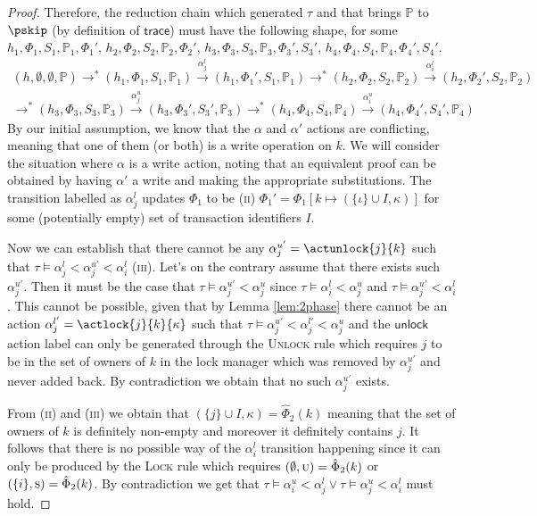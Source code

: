 \begin{proof}
Therefore, the reduction chain which generated $\tau$ and that brings $\mathds{P}$ to $\pskip$ (by definition of $\mathsf{trace}$) must have the following shape, for some $h_1, \Phi_1, S_1, \mathds{P}_1, \Phi_1'$, $h_2, \Phi_2, S_2, \mathds{P}_2, \Phi_2'$, $h_3, \Phi_3, S_3, \mathds{P}_3, \Phi_3', S_3'$, $h_4, \Phi_4, S_4, \mathds{P}_4, \Phi_4', S_4'$.
\begin{gather*}
(h, \emptyset, \emptyset, \mathds{P}) \rightarrow^* (h_1, \Phi_1, S_1, \mathds{P}_1) \xrightarrow{\alpha_j^l} (h_1, \Phi_1', S_1, \mathds{P}_1) \rightarrow^* (h_2, \Phi_2, S_2, \mathds{P}_2) \xrightarrow{\alpha_i^l} (h_2, \Phi_2', S_2, \mathds{P}_2)
\\
\rightarrow^* (h_3, \Phi_3, S_3, \mathds{P}_3) \xrightarrow{\alpha_j^u} (h_3, \Phi_3', S_3', \mathds{P}_3) \rightarrow^* (h_4, \Phi_4, S_4, \mathds{P}_4) \xrightarrow{\alpha_i^u} (h_4, \Phi_4', S_4', \mathds{P}_4)
\end{gather*}
By our initial assumption, we know that the $\alpha$ and $\alpha'$ actions are conflicting, meaning that one of them (or both) is a write operation on $k$. We will consider the situation where $\alpha$ is a write action, noting that an equivalent proof can be obtained by having $\alpha'$ a write and making the appropriate substitutions. The transition labelled as $\alpha_j^l$ updates $\Phi_1$ to be (\textsc{ii}) $\Phi_1' = \Phi_1[k \mapsto (\{\iota\} \cup I, \kappa)]$ for some (potentially empty) set of transaction identifiers $I$.

Now we can establish that there cannot be any $\alpha_j^{u'} = \actunlock{j}{k}$ such that $\tau \vDash \alpha_j^l < \alpha_j^{u'} < \alpha_i^l$ (\textsc{iii}). Let's on the contrary assume that there exists such $\alpha_j^{u'}$. Then it must be the case that $\tau \vDash \alpha_j^{u'} < \alpha_j^{u}$ since $\tau \vDash \alpha_i^l < \alpha_j^u$ and $\tau \vDash \alpha_j^{u'} < \alpha_i^l$. This cannot be possible, given that by Lemma \ref{lem:2phase} there cannot be an action $\alpha_j^{l'} = \actlock{j}{k}{\kappa}$ such that $\tau \vDash \alpha_j^{u'} < \alpha_j^{l'} < \alpha_j^{u}$ and the $\mathsf{unlock}$ action label can only be generated through the \textsc{Unlock} rule which requires $j$ to be in the set of owners of $k$ in the lock manager which was removed by $\alpha_j^{u'}$ and never added back. By contradiction we obtain that no such $\alpha_j^{u'}$ exists.

From (\textsc{ii}) and (\textsc{iii}) we obtain that $(\{j\} \cup I, \kappa) = \hat{\Phi}_2(k)$ meaning that the set of owners of $k$ is definitely non-empty and moreover it definitely contains $j$. It follows that there is no possible way of the $\alpha_i^l$ transition happening since it can only be produced by the \textsc{Lock} rule which requires $(\emptyset, \textsc{u}) = \hat{\Phi}_2(k)$ or $(\{ i \}, \textsc{s}) = \hat{\Phi}_2(k)$. By contradiction we get that $\tau \vDash \alpha_i^u < \alpha_j^l  \lor \tau \vDash \alpha_j^u < \alpha_i^l$ must hold.
\end{proof}

